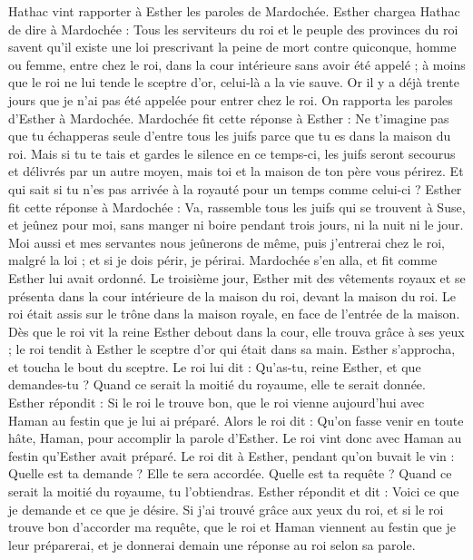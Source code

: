\begin{multicols}{2}
Hathac vint rapporter à Esther les paroles de Mardochée.
Esther chargea Hathac de dire à Mardochée :
Tous les serviteurs du roi et le peuple des provinces du roi savent qu'il existe une loi prescrivant la peine de mort contre quiconque, homme ou femme, entre chez le roi, dans la cour intérieure sans avoir été appelé ; à moins que le roi ne lui tende le sceptre d'or, celui-là a la vie sauve. Or il y a déjà trente jours que je n'ai pas été appelée pour entrer chez le roi.
On rapporta les paroles d'Esther à Mardochée.
Mardochée fit cette réponse à Esther : Ne t’imagine pas que tu échapperas seule d'entre tous les juifs parce que tu es dans la maison du roi.
Mais si tu te tais et gardes le silence en ce temps-ci, les juifs seront secourus et délivrés par un autre moyen, mais toi et la maison de ton père vous périrez. Et qui sait si tu n'es pas arrivée à la royauté pour un temps comme celui-ci ?
Esther fit cette réponse à Mardochée :
Va, rassemble tous les juifs qui se trouvent à Suse, et jeûnez pour moi, sans manger ni boire pendant trois jours, ni la nuit ni le jour. Moi aussi et mes servantes nous jeûnerons de même, puis j'entrerai chez le roi, malgré la loi ; et si je dois périr, je périrai.
Mardochée s'en alla, et fit comme Esther lui avait ordonné.
\VerseOne{}Le troisième jour, Esther mit des vêtements royaux et se présenta dans la cour intérieure de la maison du roi, devant la maison du roi. Le roi était assis sur le trône dans la maison royale, en face de l’entrée de la maison.
Dès que le roi vit la reine Esther debout dans la cour, elle trouva grâce à ses yeux ; le roi tendit à Esther le sceptre d'or qui était dans sa main. Esther s'approcha, et toucha le bout du sceptre.
Le roi lui dit : Qu'as-tu, reine Esther, et que demandes-tu ? Quand ce serait la moitié du royaume, elle te serait donnée.
Esther répondit : Si le roi le trouve bon, que le roi vienne aujourd'hui avec Haman au festin que je lui ai préparé.
Alors le roi dit : Qu'on fasse venir en toute hâte, Haman, pour accomplir la parole d'Esther. Le roi vint donc avec Haman au festin qu'Esther avait préparé.
Le roi dit à Esther, pendant qu’on buvait le vin : Quelle est ta demande ? Elle te sera accordée. Quelle est ta requête ? Quand ce serait la moitié du royaume, tu l’obtiendras.
Esther répondit et dit : Voici ce que je demande et ce que je désire.
Si j'ai trouvé grâce aux yeux du roi, et si le roi trouve bon d'accorder ma requête, que le roi et Haman viennent au festin que je leur préparerai, et je donnerai demain une réponse au roi selon sa parole.

\end{multicols}

